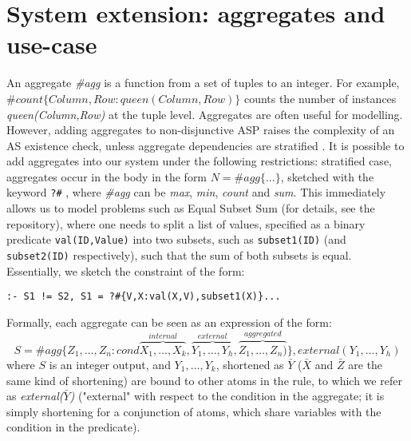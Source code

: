 
\section{System extension: aggregates and use-case}\label{section:aggregates}
An aggregate \textit{\#agg} is a function from a set of tuples to an integer. For example,\\$\#\textit{count}\{ Column,Row: \textit{queen}(Column,Row) \}$ counts the number of instances\\\textit{queen(Column,Row)} at the tuple level. Aggregates are often useful for modelling. 
However, adding aggregates to non-disjunctive ASP raises the complexity of an AS existence check, unless aggregate dependencies are stratified \parencite{aggregates_complexity}. It is possible to add aggregates into our system under the following restrictions: stratified case, aggregates occur in the body in the form ${N = \#\textit{agg}\{ \dots \}}$, sketched with the keyword \verb|?#| , where \textit{\#agg} can be \textit{max}, \textit{min}, \textit{count} and \textit{sum}. This immediately allows us  to model problems such as Equal Subset Sum (for details, see the repository), where one needs to split a list of values, specified as a binary predicate   \verb|val(ID,Value)| into two subsets, such as \verb|subset1(ID)| (and \verb|subset2(ID)| respectively), such that the sum of both subsets is equal. Essentially, we sketch the constraint of the form: 

\verb|:- S1 != S2, S1 = ?#{V,X:val(X,V),subset1(X)}...|

Formally, each aggregate can be seen as an expression of the form:
\begin{equation*}
	S = \#\textit{agg}\{ Z_1,\dots,Z_n: \textit{cond}\overbrace{X_1,\dots,X_k}^{\textit{internal}}, \overbrace{Y_1,\dots,Y_h}^{\textit{external}},\overbrace{Z_1,\dots,Z_n)}^{\textit{aggregated}} \}, \textit{external}(Y_1,\dots,Y_h)
\end{equation*}
	where $S$ is an integer output, and $Y_1,\dots,Y_k$, shortened as $\bar Y$ ($\bar X$ and $\bar Z$ are the same kind of shortening) are bound to other atoms in the rule, to which we refer as \textit{external($\bar Y$)} ("external" with respect to the condition in the aggregate; it is simply shortening for a conjunction of atoms, which share variables with the condition in the predicate). 

